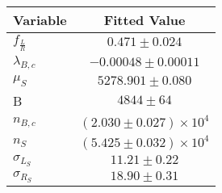\begin{tabular}[t]{lc}
\hline
Variable &Fitted Value\\
\hline\hline
$f_{\frac{L}{R}}$&$0.471\pm0.024$\\
\hline
$\lambda_{B,c}$&$-0.00048\pm0.00011$\\
\hline
$\mu_S$&$5278.901\pm0.080$\\
\hline
B&$4844\pm64$\\
\hline
$n_{B,c}$&$(2.030\pm0.027)\times 10^4$\\
\hline
$n_S$&$(5.425\pm0.032)\times 10^4$\\
\hline
$\sigma_{L_S}$&$11.21\pm0.22$\\
\hline
$\sigma_{R_S}$&$18.90\pm0.31$\\
\hline
\end{tabular}